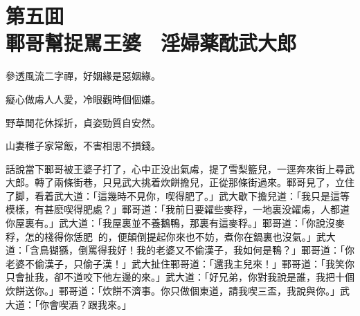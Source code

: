 
\chapter*{第五囬　\\鄆哥幫捉駡王婆　淫婦薬酖武大郎}


\begin{myquote}
參透風流二字禪，好姻緣是惡姻緣。

癡心做䖏人人愛，冷眼觀時個個嫌。

野草閒花休採折，貞姿勁質自安然。

山妻稚子家常飯，不害相思不損錢。
\end{myquote}

話說當下鄆哥被王婆子打了，心中正没出氣䖏，提了雪梨籃兒，一逕奔來街上尋武大郎。轉了兩條街巷，只見武大挑着炊餅擔兒，正從那條街過來。鄆哥見了，立住了脚，看着武大道：「這幾時不見你，喫得肥了。」武大歇下擔兒道：「我只是這等模樣，有甚麽喫得肥處？」鄆哥道：「我前日要糴些麥稃，一地裏没糴䖏，人都道你屋裏有。」武大道：「我屋裏並不養鵝鴨，那裏有這麥稃。」鄆哥道：「你說沒麥稃，怎的棧得你恁肥𦞂𦞂的，便顛倒提起你來也不妨，煮你在鍋裏也沒氣。」武大道：「含鳥猢猻，倒罵得我好！我的老婆又不偷漢子，我如何是鴨？」鄆哥道：「你老婆不偷漢子，只偷子漢！」武大扯住鄆哥道：「還我主兒來！」鄆哥道：「我笑你只會扯我，卻不道咬下他左邊的來。」武大道：「好兄弟，你對我說是誰，我把十個炊餅送你。」鄆哥道：「炊餅不濟事。你只做個東道，請我喫三盃，我說與你。」武大道：「你會喫酒？跟我來。」

